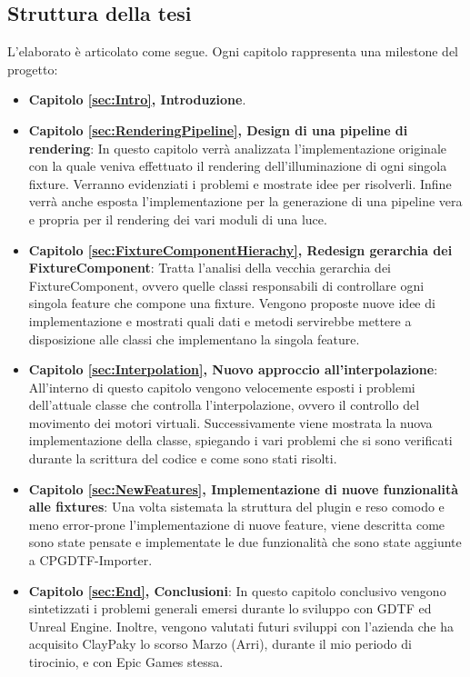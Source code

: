 \documentclass[main.tex]{subfiles}
\begin{document}
\subsection{Struttura della tesi}\label{subsec:1_thesisInfo}
L'elaborato è articolato come segue. Ogni capitolo rappresenta una milestone del progetto:
\begin{itemize}
    \item \textbf{Capitolo \ref{sec:Intro}, Introduzione}. %
    \item \textbf{Capitolo \ref{sec:RenderingPipeline}, Design di una pipeline di rendering}: In questo capitolo verrà analizzata l'implementazione originale con la quale veniva effettuato il rendering dell'illuminazione di ogni singola fixture. Verranno evidenziati i problemi e mostrate idee per risolverli. Infine verrà anche esposta l'implementazione per la generazione di una pipeline vera e propria per il rendering dei vari moduli di una luce. 
    \item \textbf{Capitolo \ref{sec:FixtureComponentHierachy}, Redesign gerarchia dei FixtureComponent}: Tratta l'analisi della vecchia gerarchia dei FixtureComponent, ovvero quelle classi responsabili di controllare ogni singola feature che compone una fixture. Vengono proposte nuove idee di implementazione e mostrati quali dati e metodi servirebbe mettere a disposizione alle classi che implementano la singola feature.
    \item \textbf{Capitolo \ref{sec:Interpolation}, Nuovo approccio all'interpolazione}: All'interno di questo capitolo vengono velocemente esposti i problemi dell'attuale classe che controlla l'interpolazione, ovvero il controllo del movimento dei motori virtuali. Successivamente viene mostrata la nuova implementazione della classe, spiegando i vari problemi che si sono verificati durante la scrittura del codice e come sono stati risolti.
    \item \textbf{Capitolo \ref{sec:NewFeatures}, Implementazione di nuove funzionalità alle fixtures}: Una volta sistemata la struttura del plugin e reso comodo e meno error-prone l'implementazione di nuove feature, viene descritta come sono state pensate e implementate le due funzionalità che sono state aggiunte a CPGDTF-Importer.
    \item \textbf{Capitolo \ref{sec:End}, Conclusioni}: In questo capitolo conclusivo vengono sintetizzati i problemi generali emersi durante lo sviluppo con GDTF ed Unreal Engine. Inoltre, vengono valutati futuri sviluppi con l'azienda che ha acquisito ClayPaky lo scorso Marzo (Arri), durante il mio periodo di tirocinio, e con Epic Games stessa.
\end{itemize}
\end{document}
